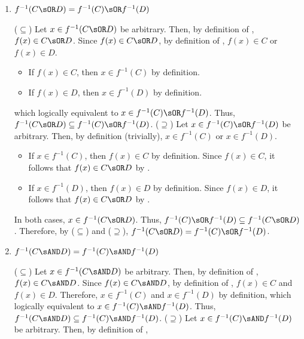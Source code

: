 \begin{enumerate}
\begin{enumerate}
    \newpage
    \item $f^{-1}(C \sOR D)=f^{-1}(C) \sOR f^{-1}(D)$
    \begin{subprove}
      ($\subseteq$) Let $x \in f^{-1}(C \sOR D)$ be arbitrary. Then, by definition of , 
      $f(x) \in C \sOR D$.
      Since $f(x) \in C \sOR D$, by definition of , $f(x) \in C$ or $f(x) \in D$.
      \begin{itemize}
        \item If $f(x) \in C$, then $x \in f^{-1}(C)$ by definition.
        \item If $f(x) \in D$, then $x \in f^{-1}(D)$ by definition.
      \end{itemize}
      which logically equivalent to $x \in f^{-1}(C) \sOR f^{-1}(D)$.
      Thus, $f^{-1}(C \sOR D) \subseteq f^{-1}(C) \sOR f^{-1}(D)$.\proofstep
      ($\supseteq$) Let $x \in f^{-1}(C) \sOR f^{-1}(D)$ be arbitrary. Then, by definition (trivially), 
      $x \in f^{-1}(C)$ or $x \in f^{-1}(D)$.
      \begin{itemize}
        \item If $x \in f^{-1}(C)$, then $f(x) \in C$ by definition.
        Since $f(x) \in C$, it follows that $f(x) \in C \sOR D$ by .
        \item If $x \in f^{-1}(D)$, then $f(x) \in D$ by definition.
        Since $f(x) \in D$, it follows that $f(x) \in C \sOR D$ by .
      \end{itemize}
      In both cases, $x \in f^{-1}(C \sOR D)$.
      Thus, $f^{-1}(C) \sOR f^{-1}(D) \subseteq f^{-1}(C \sOR D)$.\proofstep
      Therefore, by ($\subseteq$) and ($\supseteq$), $f^{-1}(C \sOR D)=f^{-1}(C) \sOR f^{-1}(D)$.
    \end{subprove}
    \item $f^{-1}(C \sAND D)=f^{-1}(C) \sAND f^{-1}(D)$
    \begin{subprove}
      ($\subseteq$) Let $x \in f^{-1}(C \sAND D)$ be arbitrary. Then, by definition of , 
      $f(x) \in C \sAND D$.
      Since $f(x) \in C \sAND D$, by definition of , $f(x) \in C$ and $f(x) \in D$.
      Therefore, $x \in f^{-1}(C)$ and $x \in f^{-1}(D)$ by definition,
      which logically equivalent to $x \in f^{-1}(C) \sAND f^{-1}(D)$.
      Thus, $f^{-1}(C \sAND D) \subseteq f^{-1}(C) \sAND f^{-1}(D)$.\proofstep
      ($\supseteq$) Let $x \in f^{-1}(C) \sAND f^{-1}(D)$ be arbitrary. Then, by definition of , 

\end{subprove}
\end{enumerate}
\end{enumerate}
